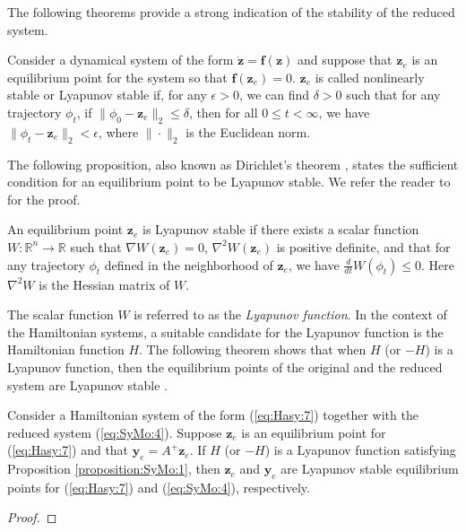 \documentclass[final]{siamart}
\begin{document}
{{\color{black}} 
The following theorems provide a strong indication of the stability of the reduced system. 

\begin{definition} \label{definition:SyMo:1} \cite{bhatia2002stability}
Consider a dynamical system of the form $\dot{\mathbf z} = \mathbf f(\mathbf z)$ and suppose that $\mathbf z_e$ is an equilibrium point for the system so that $\mathbf f(\mathbf z_e) = 0$. $\mathbf z_e$ is called nonlinearly stable or Lyapunov stable if, for any $\epsilon > 0$, we can find $\delta > 0$ such that for any trajectory $\phi_t$, if $\| \phi_0 - \mathbf z_e \|_2 \leq \delta$, then for all $0 \leq t < \infty$, we have $\| \phi_t - \mathbf z_e \|_2 < \epsilon$, where $\| \cdot \|_2$ is the Euclidean norm.
\end{definition}	
The following proposition, also known as Dirichlet's theorem \cite{bhatia2002stability}, states the sufficient condition for an equilibrium point to be Lyapunov stable. We refer the reader to \cite{bhatia2002stability} for the proof.
\begin{proposition} \label{proposition:SyMo:1} \cite{bhatia2002stability}
An equilibrium point $\mathbf z_e$ is Lyapunov stable if there exists a scalar function $W : \mathbb R^{n} \to  \mathbb R$ such that $\nabla W(\mathbf z_e) = 0$, $\nabla^2 W(\mathbf z_e)$ is positive definite, and that for any trajectory $\phi_t$ defined in the neighborhood of $\mathbf z_e$, we have $\frac{d}{dt} W(\phi_t) \leq 0$. Here $\nabla^2W$ is the Hessian matrix of $W$.
\end{proposition}
The scalar function $W$ is referred to as the \emph{Lyapunov function}. In the context of the Hamiltonian systems, a suitable candidate for the Lyapunov function is the Hamiltonian function $H$. The following theorem shows that when $H$ (or $-H$) is a Lyapunov function, then the equilibrium points of the original and the reduced system are Lyapunov stable \cite{abraham1978foundations}. 
\begin{theorem} \label{theorem:SyMo:1}
Consider a Hamiltonian system of the form (\ref{eq:Hasy:7}) together with the reduced system (\ref{eq:SyMo:4}). Suppose $\mathbf z_e$ is an equilibrium point for (\ref{eq:Hasy:7}) and that $\mathbf y_e = A^+\mathbf z_e$. If $H$ (or $-H$) is a Lyapunov function satisfying Proposition \ref{proposition:SyMo:1}, then $\mathbf z_e$ and $\mathbf y_e$ are Lyapunov stable equilibrium points for (\ref{eq:Hasy:7}) and (\ref{eq:SyMo:4}), respectively. 
\end{theorem}
\begin{proof}

\end{proof}}
\end{document}
